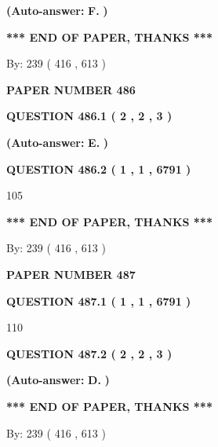 \documentclass[12pt]{article}
\begin{document}
 
{\textbf{(Auto-answer:}}
{\textbf{\large{
F.}}}
{\textbf{)}}
 
 
   
   
   
   
\vspace{1.0in} 
{\textbf{\large{ *** END OF PAPER, THANKS *** }}} 
   
   
\hspace{1.0in} By: 
 239 ( 416 ,  613 )
   
   
   
   
\newpage 
\setcounter{page}{ 
   486001 } 
   
   
 {\textbf{ \Large{ PAPER NUMBER  486  }}}
   
   
   
   
  
  
{\textbf{\large{QUESTION
486.1 
 ( 2 , 2 , 3 )
}}}
 
 
{\textbf{(Auto-answer:}}
{\textbf{\large{
E.}}}
{\textbf{)}}
 
 
  
  
{\textbf{\large{QUESTION
486.2 
 ( 1 , 1 , 6791 )
}}}

105
   
   
   
   
\vspace{1.0in} 
{\textbf{\large{ *** END OF PAPER, THANKS *** }}} 
   
   
\hspace{1.0in} By: 
 239 ( 416 ,  613 )
   
   
   
   
\newpage 
\setcounter{page}{ 
   487001 } 
   
   
 {\textbf{ \Large{ PAPER NUMBER  487  }}}
   
   
   
   
  
  
{\textbf{\large{QUESTION
487.1 
 ( 1 , 1 , 6791 )
}}}

110
  
  
{\textbf{\large{QUESTION
487.2 
 ( 2 , 2 , 3 )
}}}
 
 
{\textbf{(Auto-answer:}}
{\textbf{\large{
D.}}}
{\textbf{)}}
 
 
   
   
   
   
\vspace{1.0in} 
{\textbf{\large{ *** END OF PAPER, THANKS *** }}} 
   
   
\hspace{1.0in} By: 
 239 ( 416 ,  613 )
   
   
   
\end{document}
